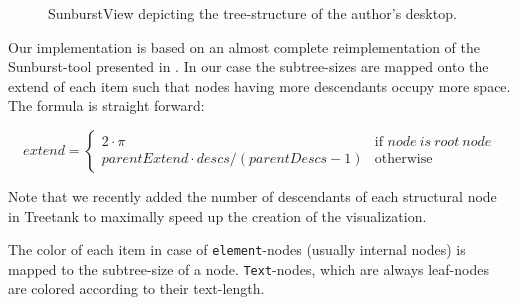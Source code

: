 \begin{itemize}
\begin{figure}[tb]
\caption{\label{fig:sunburstview} SunburstView depicting the tree-structure of the author's desktop.}
\end{figure}

Our implementation is based on an almost complete reimplementation of the Sunburst-tool presented in \cite{generativegest}. In our case the subtree-sizes are mapped onto the extend of each item such that nodes having more descendants occupy more space. The formula is straight forward:

\begin{equation}
extend = \left\{ \begin{array}{cl}
2 \cdot \pi & \textrm{if }node\ is\ root\ node\\
parentExtend \cdot descs / (parentDescs - 1) & \textrm{otherwise}\end{array}\right.
\end{equation}

Note that we recently added the number of descendants of each structural node in Treetank to maximally speed up the creation of the visualization. 

The color of each item in case of \texttt{element}-nodes (usually internal nodes) is mapped to the subtree-size of a node. \texttt{Text}-nodes, which are always leaf-nodes are colored according to their text-length.


\end{itemize}
